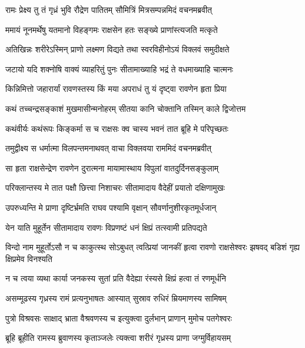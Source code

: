 
\twolineshloka
{रामः प्रेक्ष्य तु तं गृध्रं भुवि रौद्रेण पातितम्}
{सौमित्रिं मित्रसम्पन्नमिदं वचनमब्रवीत्} %

\twolineshloka
{ममायं नूनमर्थेषु यतमानो विहङ्गमः}
{राक्षसेन हतः सङ्ख्ये प्राणांस्त्यजति मत्कृते} %

\twolineshloka
{अतिखिन्नः शरीरेऽस्मिन् प्राणो लक्ष्मण विद्यते}
{तथा स्वरविहीनोऽयं विक्लवं समुदीक्षते} %

\twolineshloka
{जटायो यदि शक्नोषि वाक्यं व्याहरितुं पुनः}
{सीतामाख्याहि भद्रं ते वधमाख्याहि चात्मनः} %

\twolineshloka
{किन्निमित्तो जहारार्यां रावणस्तस्य किं मया}
{अपराधं तु यं दृष्ट्वा रावणेन हृता प्रिया} %

\twolineshloka
{कथं तच्चन्द्रसङ्काशं मुखमासीन्मनोहरम्}
{सीतया कानि चोक्तानि तस्मिन् काले द्विजोत्तम} %

\twolineshloka
{कथंवीर्यः कथंरूपः किङ्कर्मा स च राक्षसः}
{क्व चास्य भवनं तात ब्रूहि मे परिपृच्छतः} %

\twolineshloka
{तमुद्वीक्ष्य स धर्मात्मा विलपन्तमनाथवत्}
{वाचा विक्लवया राममिदं वचनमब्रवीत्} %

\twolineshloka
{सा हृता राक्षसेन्द्रेण रावणेन दुरात्मना}
{मायामास्थाय विपुलां वातदुर्दिनसङ्कुलाम्} %

\twolineshloka
{परिक्लान्तस्य मे तात पक्षौ छित्त्वा निशाचरः}
{सीतामादाय वैदेहीं प्रयातो दक्षिणामुखः} %

\twolineshloka
{उपरुध्यन्ति मे प्राणा दृष्टिर्भ्रमति राघव}
{पश्यामि वृक्षान् सौवर्णानुशीरकृतमूर्धजान्} %

\twolineshloka
{येन याति मुहूर्तेन सीतामादाय रावणः}
{विप्रणष्टं धनं क्षिप्रं तत्स्वामी प्रतिपद्यते} %

\threelineshloka
{विन्दो नाम मुहूर्तोऽसौ न च काकुत्स्थ सोऽबुधत्}
{त्वत्प्रियां जानकीं हृत्वा रावणो राक्षसेश्वरः}
{झषवद् बडिशं गृह्य क्षिप्रमेव विनश्यति} %

\twolineshloka
{न च त्वया व्यथा कार्या जनकस्य सुतां प्रति}
{वैदेह्या रंस्यसे क्षिप्रं हत्वा तं रणमूर्धनि} %

\twolineshloka
{असम्मूढस्य गृध्रस्य रामं प्रत्यनुभाषतः}
{आस्यात् सुस्राव रुधिरं म्रियमाणस्य सामिषम्} %

\twolineshloka
{पुत्रो विश्रवसः साक्षाद् भ्राता वैश्रवणस्य च}
{इत्युक्त्वा दुर्लभान् प्राणान् मुमोच पतगेश्वरः} %

\twolineshloka
{ब्रूहि ब्रूहीति रामस्य ब्रुवाणस्य कृताञ्जलेः}
{त्यक्त्वा शरीरं गृध्रस्य प्राणा जग्मुर्विहायसम्} %

